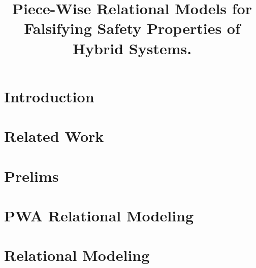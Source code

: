 \documentclass{sig-alternate}
\begin{document}



\title{Piece-Wise Relational Models for \\ Falsifying Safety
Properties of Hybrid Systems.
}





\maketitle

\begin{abstract}
  
\end{abstract}


\section{Introduction}
\label{sec:intro}



\section{Related Work}
\label{sec:rel}


\section{Prelims}
\label{sec:prelims}


\section{PWA Relational Modeling}
\label{sec:pwa-rel}


\section{Relational Modeling}
\label{sec:rel-mod}

\end{document}
